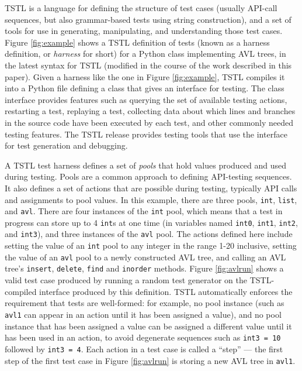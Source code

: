 TSTL \cite{NFM15,ISSTA15,tstl} is a language for defining the
structure of test cases (usually API-call sequences, but also
grammar-based tests using string construction), and a set of tools for
use in generating, manipulating, and understanding those test cases.
Figure \ref{fig:example} shows a TSTL definition of tests (known as a
harness definition, or \emph{harness} for short) for a Python class
implementing AVL trees, in the latest syntax for TSTL (modified in the
course of the work described in this paper).  Given a harness like the
one in Figure \ref{fig:example}, TSTL compiles it into a Python file
defining a class that gives an interface for testing.  The class
interface provides features such as
querying the set of available testing actions, restarting a test,
replaying a test, collecting data about which lines and branches in
the source code have been executed by each test, and other commonly
needed testing features.  The TSTL release \cite{tstl} provides
testing tools that use the interface for test generation and
debugging.

A TSTL test harness defines a set of \emph{pools} that hold values
produced and used during testing.  Pools \cite{AndrewsTR} are a common
approach to defining API-testing sequences.  It also defines a set of
actions that are possible during testing, typically API calls and
assignments to pool values.  In this example, there are three pools,
{\tt int}, {\tt list}, and {\tt avl}.  There are four instances of the
{\tt int} pool, which means that a test in progress can store up to 4
{\tt int}s at one time (in variables named {\tt int0}, {\tt int1},
{\tt int2}, and {\tt int3}), and three instances of the {\tt avl}
pool.  The actions defined here include setting the value of an {\tt int}
pool to any integer in the range 1-20 inclusive, setting the value of
an {\tt avl} pool to a newly constructed AVL tree, and calling an AVL
tree's {\tt insert}, {\tt delete}, {\tt find} and {\tt inorder}
methods.  Figure \ref{fig:avlrun} shows a valid test case produced by
running a random test generator on the TSTL-compiled interface
produced by this definition.  TSTL automatically enforces the requirement that
tests are well-formed: for example, no pool instance (such as {\tt
  avl1} can appear in an action until it has been assigned a value),
and no pool instance that has been assigned a value can be assigned a
different value until it has been used in an action, to avoid
degenerate sequences such as {\tt int3 = 10} followed by {\tt int3 =
  4}.  Each action in a test case is called a ``step'' --- the first
step of the first test case in Figure \ref{fig:avlrun} is storing a
new AVL tree in {\tt avl1}.

